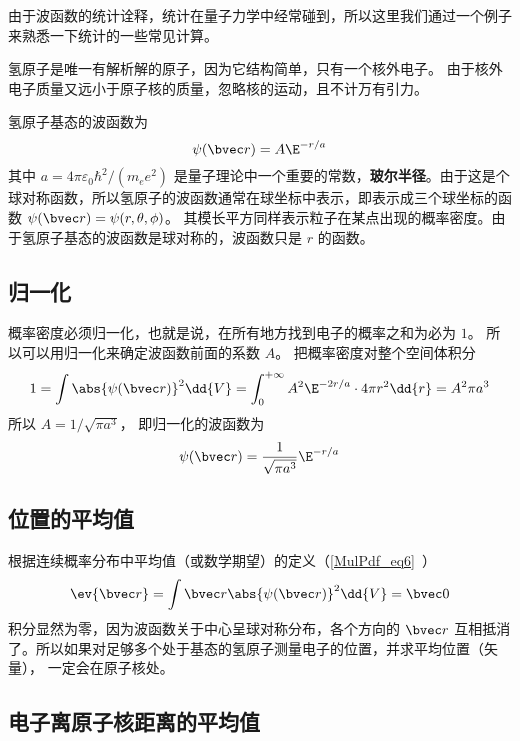 

由于波函数的统计诠释，统计在量子力学中经常碰到，所以这里我们通过一个例子来熟悉一下统计的一些常见计算。

氢原子是唯一有解析解的原子，因为它结构简单，只有一个核外电子。 由于核外电子质量又远小于原子核的质量，忽略核的运动，且不计万有引力。

氢原子基态的波函数为
\begin{equation}
\psi(\bvec r) = A\E^{-r/a}
\end{equation}
其中 $a = 4\pi\varepsilon_0 \hbar ^2/(m_e e^2)$ 是量子理论中一个重要的常数，\textbf{玻尔半径}。由于这是个球对称函数，所以氢原子的波函数通常在球坐标中表示，即表示成三个球坐标的函数 $\psi (\bvec r) = \psi (r, \theta, \phi)$。 其模长平方同样表示粒子在某点出现的概率密度。由于氢原子基态的波函数是球对称的，波函数只是 $r$ 的函数。

\subsection{归一化}
  
概率密度必须归一化，也就是说，在所有地方找到电子的概率之和为必为 $1$。 所以可以用归一化来确定波函数前面的系数 $A$。 把概率密度对整个空间体积分
\begin{equation}
1 = \int \abs{\psi(\bvec r)} ^2 \dd{V}  = \int_0^{+\infty} A^2 \E^{-2r/a} \cdot 4\pi r^2\dd{r} = A^2 \pi a^3
\end{equation}
所以 $A = 1/\sqrt{\pi a^3}$， 即归一化的波函数为
\begin{equation}
\psi (\bvec r) = \frac{1}{\sqrt{\pi a^3}} \E^{-r/a}
\end{equation}

\subsection{位置的平均值}

 根据连续概率分布中平均值（或数学期望）的定义（\autoref{MulPdf_eq6}~）
\begin{equation}
\ev{\bvec r} = \int \bvec r \abs{\psi (\bvec r)} ^2 \dd{V} =  \bvec 0
\end{equation}
积分显然为零，因为波函数关于中心呈球对称分布，各个方向的 $\bvec r$ 互相抵消了。所以如果对足够多个处于基态的氢原子测量电子的位置，并求平均位置（矢量）， 一定会在原子核处。

\subsection{电子离原子核距离的平均值}

